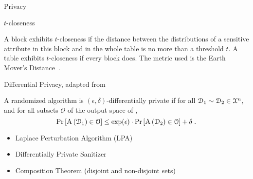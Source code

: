 	\begin{frame}{Privacy}

		\begin{block}{$t$-closeness~\cite{t-closeness}}
			\justify%

			A block exhibits $t$-closeness if the distance between the distributions of a sensitive attribute in this block and in the whole table is no more than a threshold $t$.
			A table exhibits $t$-closeness if every block does.
			The metric used is the Earth Mover's Distance~\cite{emd}.


		\end{block}

		\pause%

		\begin{block}{Differential Privacy, adapted from~\cite{our-data-ourselves, differential-privacy-original}}
			\justify%

			A randomized algorithm  is $(\epsilon, \delta)$-differentially private if for all $\mathcal{D}_1 \sim \mathcal{D}_2 \in \mathcal{X}^{n}$, and for all subsets $\mathcal{O}$ of the output space of ,
			\[
				\probability{ \algo{A}{ \database_1 } \in \mathcal{O} } \leq \exp(\epsilon) \cdot \probability{ \algo{A}{ \database_2 } \in \mathcal{O} } + \delta \; .
			\]

			\begin{itemize}
				\item Laplace Perturbation Algorithm (LPA)~\cite[Theorem 1]{differential-privacy-original}
				\item Differentially Private Sanitizer
				\item Composition Theorem (disjoint and non-disjoint sets)
			\end{itemize}

		\end{block}

	\end{frame}


